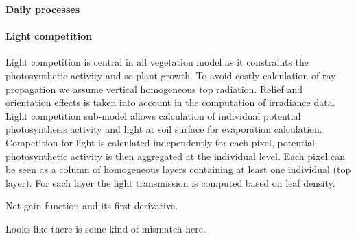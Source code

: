 \documentclass[a4paper,twoside, justified,marginals=raggedright, nobib]{tufte-handout}
\begin{document}
%
% 
%
%

\textbf{Daily processes}

\paragraph{Light competition}Light competition is central in all vegetation model as it constraints the photosynthetic activity and so plant growth. To avoid costly calculation of ray propagation we assume vertical homogeneous top radiation. Relief and orientation effects is taken into account in the computation of irradiance data.\\
Light competition sub-model allows calculation of individual potential photosynthesis activity and light at soil surface for evaporation calculation.\\
Competition for light is calculated independently for each pixel, potential photosynthetic activity is then aggregated at the individual level. Each pixel can be seen as a column of homogeneous layers containing at least one individual (top layer). For each layer the light transmission is computed based on leaf density.


\begin{marginfigure}
\label{fig:derivaives}
\caption{Net gain function and its first derivative.} Looks like there is some kind of mismatch here.
\end{marginfigure}
\end{document}
